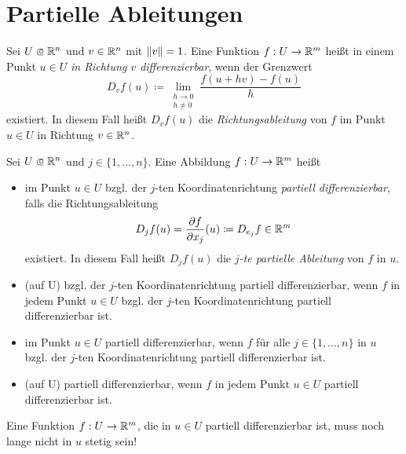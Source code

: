 \documentclass{cheat-sheet}
\begin{document}
\section{Partielle Ableitungen}

\begin{defn}
  Sei $U \opn \R^n$ und $v \in \mathbb{R}^n$ mit $\lVert v\rVert = 1$. Eine Funktion $f : U \to \mathbb{R}^m$ heißt in einem Punkt $u \in U$ \emph{in Richtung $v$ differenzierbar}, wenn der Grenzwert
  \[ D_v f(u) \coloneqq \lim_{\substack{h \to 0\\h \not= 0}} \frac{f(u + hv) - f(u)}{h} \]
  existiert. In diesem Fall heißt $D_v f(u)$ die \emph{Richtungsableitung} von $f$ im Punkt $u \in U$ in Richtung $v \in \mathbb{R}^n$.
\end{defn}

\begin{defn}
  Sei $U \opn \R^n$ und $j \in \{ 1, ..., n \}$. Eine Abbildung $f : U \to \mathbb{R}^m$ heißt
  \begin{itemize}
    \item im Punkt $u \in U$ bzgl. der $j$-ten Koordinatenrichtung \emph{partiell differenzierbar}, falls die Richtungsableitung
    \[ D_j f(u) = \frac{\partial f}{\partial x_j}(u) \coloneqq D_{e_j} f \in \mathbb{R}^m \]
    existiert. In diesem Fall heißt $D_j f(u)$ die \emph{$j$-te partielle Ableitung} von $f$ in $u$.
    \item (auf U) bzgl. der $j$-ten Koordinatenrichtung partiell differenzierbar, wenn $f$ in jedem Punkt $u \in U$ bzgl. der $j$-ten Koordinatenrichtung partiell differenzierbar ist.
    \item im Punkt $u \in U$ partiell differenzierbar, wenn $f$ für alle $j \in \{ 1, ..., n \}$ in $u$ bzgl. der $j$-ten Koordinatenrichtung partiell differenzierbar ist.
    \item (auf U) partiell differenzierbar, wenn $f$ in jedem Punkt $u \in U$ partiell differenzierbar ist.
  \end{itemize}
\end{defn}

\begin{acht}
  Eine Funktion $f : U \to \mathbb{R}^m$, die in $u \in U$ partiell differenzierbar ist, muss noch lange nicht in $u$ stetig sein!
\end{acht}
\end{document}

